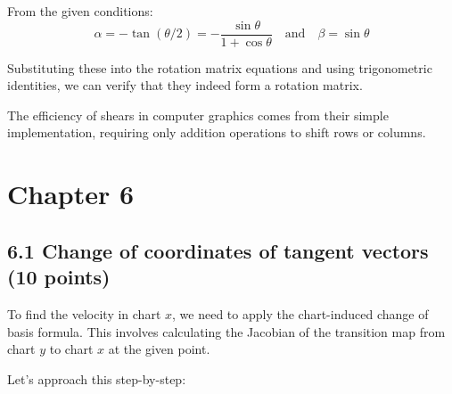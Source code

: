 \documentclass{article}
\begin{document}
From the given conditions:
\[
\alpha = -\tan(\theta/2) = -\frac{\sin\theta}{1 + \cos\theta} \quad \text{and} \quad \beta = \sin\theta
\]

Substituting these into the rotation matrix equations and using trigonometric identities, we can verify that they indeed form a rotation matrix.

The efficiency of shears in computer graphics comes from their simple implementation, requiring only addition operations to shift rows or columns.

\newpage
\section{Chapter 6}

\subsection*{6.1 Change of coordinates of tangent vectors (10 points)}

To find the velocity in chart $x$, we need to apply the chart-induced change of basis formula. This involves calculating the Jacobian of the transition map from chart $y$ to chart $x$ at the given point.

Let's approach this step-by-step:
\end{document}

